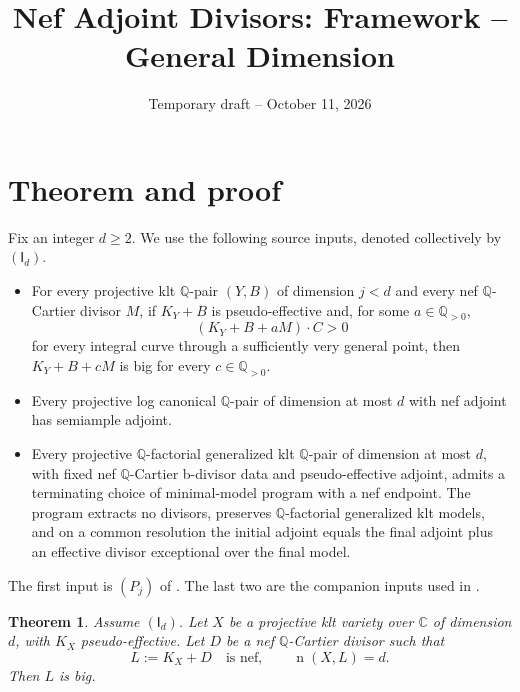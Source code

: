 \documentclass[12pt,a4paper,psamsfonts]{amsart}
\title{Nef Adjoint Divisors: Framework -- General Dimension}
\date{Temporary draft -- October 11, 2026}
\newtheorem*{theorem}{Theorem}
\theoremstyle{definition}
\theoremstyle{plain}
\newcommand{\Q}{\mathbb Q}
\newcommand{\C}{\mathbb C}
\newcommand{\nef}{\operatorname{n}}
\begin{document}
\maketitle


\section{Theorem and proof}

Fix an integer $d\ge2$. We use the following source inputs,
denoted collectively by $(\mathsf I_d)$.
\begin{itemize}
\setlength{\itemsep}{2pt}
\setlength{\parsep}{0pt}
\item For every projective klt $\Q$-pair $(Y,B)$ of dimension
$j<d$ and every nef $\mathbb{Q}$-Cartier divisor $M$, if $K_Y+B$ is
pseudo-effective and, for some $a\in\Q_{>0}$,
\[
 (K_Y+B+aM)\cdot C>0
\]
for every integral curve through a sufficiently very general point,
then $K_Y+B+cM$ is big for every $c\in\Q_{>0}$.
\item Every projective log canonical $\Q$-pair of dimension at most
$d$ with nef adjoint has semiample adjoint.
\item Every projective $\Q$-factorial generalized klt $\Q$-pair of
dimension at most $d$, with fixed nef $\mathbb{Q}$-Cartier b-divisor
data and pseudo-effective adjoint, admits a terminating choice of
minimal-model program with a nef endpoint. The program extracts no
divisors, preserves $\Q$-factorial generalized klt models, and on a
common resolution the initial adjoint equals the final adjoint plus
an effective divisor exceptional over the final model.
\end{itemize}
The first input is $(P_j)$ of \cite[Section~3.1]{NS}. The last two
are the companion inputs used in \cite[Section~2]{NS}.

\begin{theorem}
Assume $(\mathsf I_d)$. Let $X$ be a projective klt variety over
$\C$ of dimension $d$, with $K_X$ pseudo-effective. Let $D$ be a
nef $\Q$-Cartier divisor such that
\[
 L:=K_X+D\quad\text{is nef},\qquad \nef(X,L)=d.
\]
Then $L$ is big.
\end{theorem}
\end{document}
